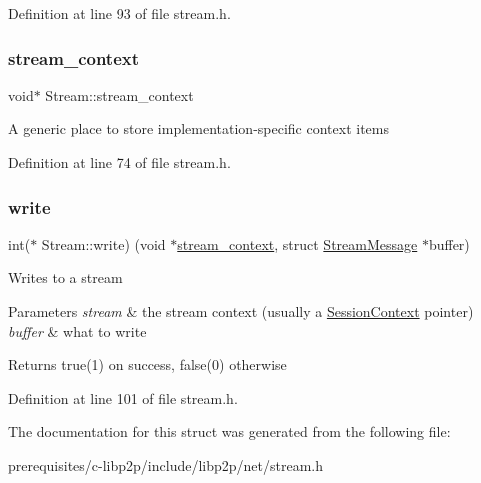 Definition at line 93 of file stream.\+h.

\mbox{\label{struct_stream_af790417ff01dff00a0109fccc33ca92d}} 
\subsubsection{\texorpdfstring{stream\+\_\+context}{stream\_context}}
{\footnotesize\ttfamily void$\ast$ Stream\+::stream\+\_\+context}

A generic place to store implementation-\/specific context items 

Definition at line 74 of file stream.\+h.

\mbox{\label{struct_stream_ada37f7d4d7dbec7712e73e542b15205f}} 
\subsubsection{\texorpdfstring{write}{write}}
{\footnotesize\ttfamily int($\ast$ Stream\+::write) (void $\ast$\mbox{\hyperlink{struct_stream_af790417ff01dff00a0109fccc33ca92d}{stream\+\_\+context}}, struct \mbox{\hyperlink{struct_stream_message}{Stream\+Message}} $\ast$buffer)}

Writes to a stream 
\begin{DoxyParams}{Parameters}
{\em stream} & the stream context (usually a \mbox{\hyperlink{struct_session_context}{Session\+Context}} pointer) \\
\hline
{\em buffer} & what to write \\
\hline
\end{DoxyParams}
\begin{DoxyReturn}{Returns}
true(1) on success, false(0) otherwise 
\end{DoxyReturn}


Definition at line 101 of file stream.\+h.



The documentation for this struct was generated from the following file\+:\begin{DoxyCompactItemize}
\item 
prerequisites/c-\/libp2p/include/libp2p/net/stream.\+h\end{DoxyCompactItemize}
